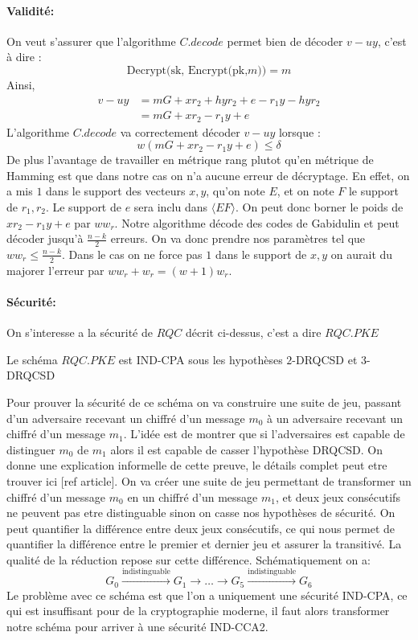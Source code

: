 \documentclass[12pt]{article}
\begin{document}
\paragraph{Validité:} On veut s'assurer que l'algorithme $C.decode$ permet bien de décoder $v-uy$, c'est à dire :
$$\text{Decrypt(sk, Encrypt(pk,}m)) = m$$
Ainsi, 
\begin{align*}
    v - uy &= mG +xr_2 + hyr_2+e - r_1y - hyr_2 \\
        &= mG + xr_2 - r_1y +e
\end{align*}
L'algorithme $C.decode$ va correctement décoder $v - uy$ lorsque :
$$ w (mG + xr_2 - r_1y +e) \leq \delta $$
De plus l'avantage de travailler en métrique rang plutot qu'en métrique de Hamming est que dans notre cas on n'a aucune erreur de décryptage. En effet, on a mis $1$ dans le support des vecteurs $x,y$, qu'on note $E$, et on note $F$ le support de $r_1, r_2$. Le support de $e$ sera inclu dans $\langle EF \rangle$. On peut donc borner le poids de $xr_2 - r_1y +e$ par $ww_r$. Notre algorithme décode des codes de Gabidulin et peut décoder jusqu'à $\frac{n-k}{2}$ erreurs. On va donc prendre nos paramètres tel que $ww_r \leq \frac{n-k}{2}$. Dans le cas on ne force pas $1$ dans le support de $x,y$ on aurait du majorer l'erreur par $ww_r + w_r = (w+1)w_r$.

\paragraph{Sécurité:}
On s'interesse a la sécurité de $RQC$ décrit ci-dessus, c'est a dire $RQC.PKE$
\begin{thm}
Le schéma $RQC.PKE$ est IND-CPA sous les hypothèses $2$-DRQCSD et $3$-DRQCSD
\end{thm}

Pour prouver la sécurité de ce schéma on va construire une suite de jeu, passant d'un adversaire recevant un chiffré d'un message $m_0$ à un adversaire recevant un chiffré d'un message $m_1$. L'idée est de montrer que si l'adversaires est capable de distinguer $m_0$ de $m_1$ alors il est capable de casser l'hypothèse DRQCSD. 
\newline
On donne une explication informelle de cette preuve, le détails complet peut etre trouver ici [ref article]. On va créer une suite de jeu permettant de transformer un chiffré d'un message $m_0$ en un chiffré d'un message $m_1$, et deux jeux consécutifs ne peuvent pas etre distinguable sinon on casse nos hypothèses de sécurité. On peut quantifier la différence entre deux jeux consécutifs, ce qui nous permet de quantifier la différence entre le premier et dernier jeu et assurer la transitivé. La qualité de la réduction repose sur cette différence. Schématiquement on a:
$$ G_0 \xrightarrow{\text{indistinguable}} G_1 \rightarrow \ldots \rightarrow G_5 \xrightarrow{\text{indistinguable}} G_6$$
Le problème avec ce schéma est que l'on a uniquement une sécurité IND-CPA, ce qui est insuffisant pour de la cryptographie moderne, il faut alors transformer notre schéma pour arriver à une sécurité IND-CCA2.
\end{document}
